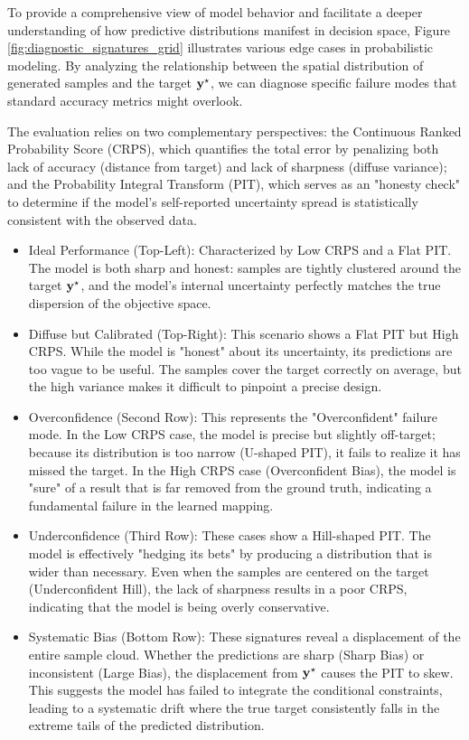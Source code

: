 To provide a comprehensive view of model behavior and facilitate a deeper understanding of how predictive distributions manifest in decision space, Figure \ref{fig:diagnostic_signatures_grid} illustrates various edge cases in probabilistic modeling. By analyzing the relationship between the spatial distribution of generated samples and the target $\mathbf{y}^\star$, we can diagnose specific failure modes that standard accuracy metrics might overlook.  

The evaluation relies on two complementary perspectives: the Continuous Ranked Probability Score (CRPS), which quantifies the total error by penalizing both lack of accuracy (distance from target) and lack of sharpness (diffuse variance); and the Probability Integral Transform (PIT), which serves as an "honesty check" to determine if the model's self-reported uncertainty spread is statistically consistent with the observed data.

\begin{itemize}
    \item Ideal Performance (Top-Left): Characterized by Low CRPS and a Flat PIT. The model is both sharp and honest: samples are tightly clustered around the target $\mathbf{y}^\star$, and the model’s internal uncertainty perfectly matches the true dispersion of the objective space.
    
    \item Diffuse but Calibrated (Top-Right): This scenario shows a Flat PIT but High CRPS. While the model is "honest" about its uncertainty, its predictions are too vague to be useful. The samples cover the target correctly on average, but the high variance makes it difficult to pinpoint a precise design.

    \item Overconfidence (Second Row): This represents the "Overconfident" failure mode. In the Low CRPS case, the model is precise but slightly off-target; because its distribution is too narrow (U-shaped PIT), it fails to realize it has missed the target. In the High CRPS case (Overconfident Bias), the model is "sure" of a result that is far removed from the ground truth, indicating a fundamental failure in the learned mapping.

    \item Underconfidence (Third Row): These cases show a Hill-shaped PIT. The model is effectively "hedging its bets" by producing a distribution that is wider than necessary. Even when the samples are centered on the target (Underconfident Hill), the lack of sharpness results in a poor CRPS, indicating that the model is being overly conservative.

    \item Systematic Bias (Bottom Row): These signatures reveal a displacement of the entire sample cloud. Whether the predictions are sharp (Sharp Bias) or inconsistent (Large Bias), the displacement from $\mathbf{y}^\star$ causes the PIT to skew. This suggests the model has failed to integrate the conditional constraints, leading to a systematic drift where the true target consistently falls in the extreme tails of the predicted distribution.
\end{itemize}

